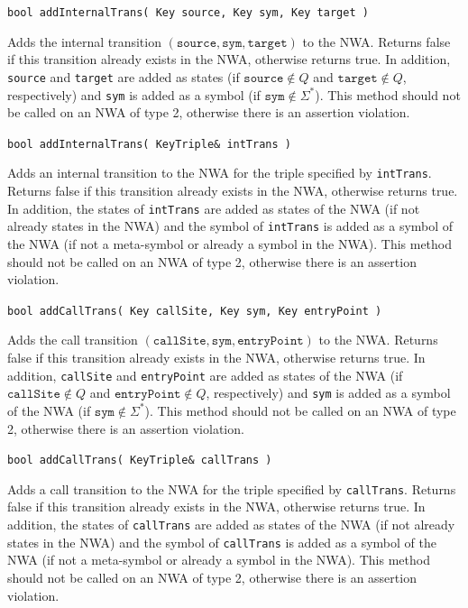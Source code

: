 \documentclass{llncs}
\begin{document}
\begin{description}

  \item\texttt{bool addInternalTrans( Key source, Key sym, Key target )} \nopagebreak

    Adds the internal transition
    $(\texttt{source},\texttt{sym},\texttt{target})$ to the NWA.  Returns
    false if this transition already exists in the NWA, otherwise returns
    true.  In addition, \texttt{source} and \texttt{target} are added as
    states (if $\texttt{source} \not\in Q$ and $\texttt{target} \not\in Q$,
    respectively) and \texttt{sym} is added as a symbol (if $\texttt{sym}
    \not\in \Sigma^*$).  This method should not be called on an NWA of type
    2, otherwise there is an assertion violation.

  \item\texttt{bool addInternalTrans( KeyTriple\& intTrans )} \nopagebreak

    Adds an internal transition to the NWA for the triple specified by
    \texttt{intTrans}.  Returns false if this transition already exists in
    the NWA, otherwise returns true.  In addition, the states of
    \texttt{intTrans} are added as states of the NWA (if not already states
    in the NWA) and the symbol of \texttt{intTrans} is added as a symbol of
    the NWA (if not a meta-symbol or already a symbol in the NWA).  This
    method should not be called on an NWA of type 2, otherwise there is an
    assertion violation.

  \item\texttt{bool addCallTrans( Key callSite, Key sym, Key entryPoint )} \nopagebreak

    Adds the call transition
    $(\texttt{callSite},\texttt{sym},\texttt{entryPoint})$ to the NWA.
    Returns false if this transition already exists in the NWA, otherwise
    returns true.  In addition, \texttt{callSite} and \texttt{entryPoint} are
    added as states of the NWA (if $\texttt{callSite} \not\in Q$ and
    $\texttt{entryPoint} \not\in Q$, respectively) and \texttt{sym} is added
    as a symbol of the NWA (if $\texttt{sym} \not\in \Sigma^*$).  This method
    should not be called on an NWA of type 2, otherwise there is an assertion
    violation.

  \item\texttt{bool addCallTrans( KeyTriple\& callTrans )} \nopagebreak

    Adds a call transition to the NWA for the triple specified by
    \texttt{callTrans}.  Returns false if this transition already exists in
    the NWA, otherwise returns true.  In addition, the states of
    \texttt{callTrans} are added as states of the NWA (if not already states
    in the NWA) and the symbol of \texttt{callTrans} is added as a symbol of
    the NWA (if not a meta-symbol or already a symbol in the NWA).  This
    method should not be called on an NWA of type 2, otherwise there is an
    assertion violation.


\end{description}
\end{document}
